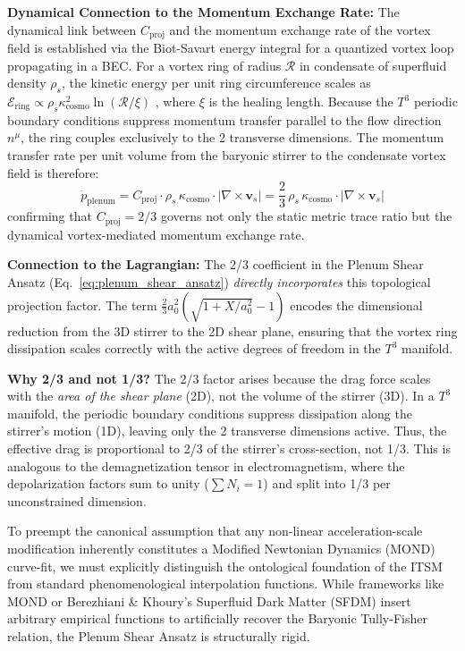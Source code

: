\documentclass[aps,prd,10pt,onecolumn,superscriptaddress,nofootinbib]{revtex4-2}
\begin{document}
\textbf{Dynamical Connection to the Momentum Exchange Rate:}
The dynamical link between $C_{\text{proj}}$ and the momentum exchange rate of the vortex field is established via the Biot-Savart energy integral for a quantized vortex loop propagating in a BEC. For a vortex ring of radius $\mathcal{R}$ in condensate of superfluid density $\rho_s$, the kinetic energy per unit ring circumference scales as $\mathcal{E}_{\text{ring}} \propto \rho_s \kappa_{\text{cosmo}}^2 \ln(\mathcal{R}/\xi)$ \cite{barcelo}, where $\xi$ is the healing length. Because the $T^3$ periodic boundary conditions suppress momentum transfer parallel to the flow direction $n^\mu$, the ring couples exclusively to the 2 transverse dimensions. The momentum transfer rate per unit volume from the baryonic stirrer to the condensate vortex field is therefore:
\begin{equation}
\dot{p}_{\text{plenum}} = C_{\text{proj}} \cdot \rho_s \, \kappa_{\text{cosmo}} \cdot |\nabla \times \mathbf{v}_s| = \frac{2}{3}\, \rho_s \, \kappa_{\text{cosmo}} \cdot |\nabla \times \mathbf{v}_s|
\end{equation}
confirming that $C_{\text{proj}} = 2/3$ governs not only the static metric trace ratio but the dynamical vortex-mediated momentum exchange rate.

\textbf{Connection to the Lagrangian:}
The 2/3 coefficient in the Plenum Shear Ansatz (Eq.~\ref{eq:plenum_shear_ansatz}) \textit{directly incorporates} this topological projection factor.
The term $\frac{2}{3} a_0^2 \left( \sqrt{1 + X/a_0^2} - 1 \right)$ encodes the dimensional reduction from the 3D stirrer to the 2D shear plane, ensuring that the vortex ring dissipation scales correctly with the active degrees of freedom in the $T^3$ manifold.

\textbf{Why 2/3 and not 1/3?}
The 2/3 factor arises because the drag force scales with the \textit{area of the shear plane} (2D), not the volume of the stirrer (3D).
In a $T^3$ manifold, the periodic boundary conditions suppress dissipation along the stirrer's motion (1D), leaving only the 2 transverse dimensions active.
Thus, the effective drag is proportional to 2/3 of the stirrer's cross-section, not 1/3.
This is analogous to the demagnetization tensor in electromagnetism, where the depolarization factors sum to unity ($\sum N_i = 1$) and split into 1/3 per unconstrained dimension.

To preempt the canonical assumption that any non-linear acceleration-scale modification inherently constitutes a Modified Newtonian Dynamics (MOND) curve-fit, we must explicitly distinguish the ontological foundation of the ITSM from standard phenomenological interpolation functions. While frameworks like MOND or Berezhiani \& Khoury's Superfluid Dark Matter (SFDM) insert arbitrary empirical functions to artificially recover the Baryonic Tully-Fisher relation, the Plenum Shear Ansatz is structurally rigid. 
\end{document}
